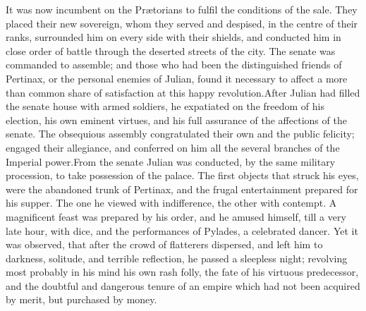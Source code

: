 It was now incumbent on the Prætorians to fulfil the conditions
of the sale. They placed their new sovereign, whom they served
and despised, in the centre of their ranks, surrounded him on
every side with their shields, and conducted him in close order
of battle through the deserted streets of the city. The senate
was commanded to assemble; and those who had been the
distinguished friends of Pertinax, or the personal enemies of
Julian, found it necessary to affect a more than common share of
satisfaction at this happy revolution.\footnotemark[12] After Julian had filled
the senate house with armed soldiers, he expatiated on the
freedom of his election, his own eminent virtues, and his full
assurance of the affections of the senate. The obsequious
assembly congratulated their own and the public felicity; engaged
their allegiance, and conferred on him all the several branches
of the Imperial power.\footnotemark[13] From the senate Julian was conducted,
by the same military procession, to take possession of the
palace. The first objects that struck his eyes, were the
abandoned trunk of Pertinax, and the frugal entertainment
prepared for his supper. The one he viewed with indifference, the
other with contempt. A magnificent feast was prepared by his
order, and he amused himself, till a very late hour, with dice,
and the performances of Pylades, a celebrated dancer. Yet it was
observed, that after the crowd of flatterers dispersed, and left
him to darkness, solitude, and terrible reflection, he passed a
sleepless night; revolving most probably in his mind his own rash
folly, the fate of his virtuous predecessor, and the doubtful and
dangerous tenure of an empire which had not been acquired by
merit, but purchased by money.\footnotemark[14]



